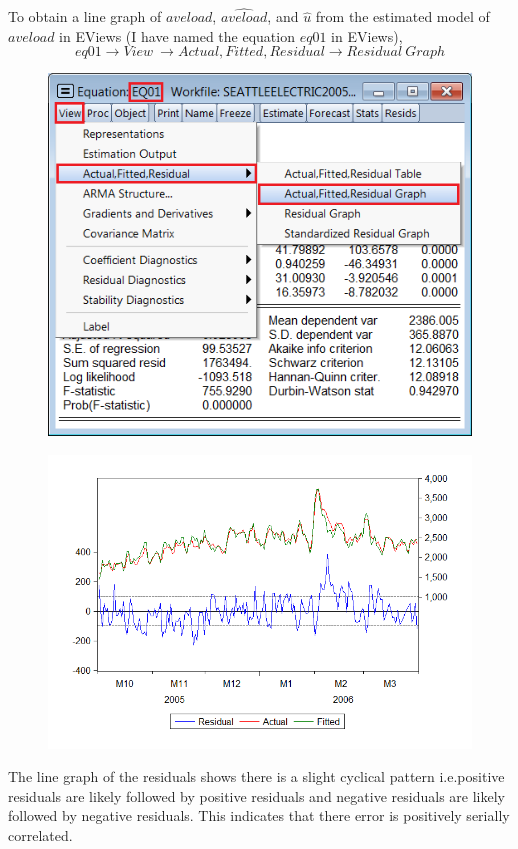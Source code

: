 \documentclass[12pt]{report}
\begin{document}
\noindent To obtain a line graph of $aveload$, $\widehat{aveload}$, and $\hat{u}$ from the estimated model of $aveload$ in EViews (I have named the equation $eq01$ in EViews), $$eq01 \to View\ \to Actual,Fitted,Residual \to Residual\ Graph$$
\begin{figure}[H]
	\centerline{\includegraphics{tute10_2}}
\end{figure}
\vspace{-\baselineskip}
\begin{figure}[H]
	\centerline{\includegraphics{tute10_3}}
\end{figure}
\vspace{-\baselineskip} \noindent The line graph of the residuals shows there is a slight cyclical pattern i.e.positive residuals are likely followed by positive residuals and negative residuals are likely followed by negative residuals. This indicates that there error is positively serially correlated. 
\end{document}
